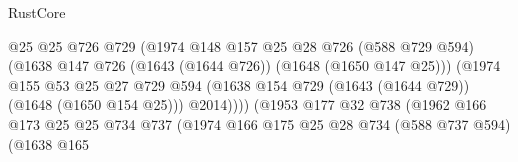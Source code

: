 \begin{lexlean}{RustCore}
\begin{coremodule}
                                            @25
                                            @25
                                            @726
                                            @729
                                            (@1974
                                              @148
                                              @157
                                              @25
                                              @28
                                              @726
                                              (@588 @729 @594)
                                              (@1638
                                                @147
                                                @726
                                                (@1643 (@1644 @726))
                                                (@1648 (@1650 @147 @25)))
                                              (@1974
                                                @155
                                                @53
                                                @25
                                                @27
                                                @729
                                                @594
                                                (@1638
                                                  @154
                                                  @729
                                                  (@1643 (@1644 @729))
                                                  (@1648 (@1650 @154 @25)))
                                                @2014))))
                                        (@1953
                                          @177
                                          @32
                                          @738
                                          (@1962
                                            @166
                                            @173
                                            @25
                                            @25
                                            @734
                                            @737
                                            (@1974
                                              @166
                                              @175
                                              @25
                                              @28
                                              @734
                                              (@588 @737 @594)
                                              (@1638
                                                @165

\end{coremodule}
\end{lexlean}
